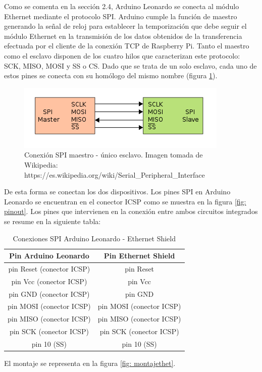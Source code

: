 Como se comenta en la sección 2.4, Arduino Leonardo se conecta al módulo Ethernet mediante el protocolo SPI. Arduino cumple la función de maestro generando la señal de reloj para establecer la temporización que debe seguir el módulo Ethernet en la transmisión de los datos obtenidos de la transferencia efectuada por el cliente de la conexión TCP de Raspberry Pi.
Tanto el maestro como el esclavo disponen de los cuatro hilos que caracterizan este protocolo: SCK, MISO, MOSI y SS o CS. Dado que se trata de un solo esclavo, cada uno de estos pines se conecta con su homólogo del mismo nombre (figura \ref{fig: SPImaestroesclavo}).
    \begin{figure}[H]
    \centering
    \includegraphics[scale = 0.6]{capitulo_04/figuras_dir/SPIconexion.jpg}
    \caption{Conexión SPI maestro - único esclavo. Imagen tomada de Wikipedia: https://es.wikipedia.org/wiki/Serial\_Peripheral\_Interface}
    \label{fig: SPImaestroesclavo}
    \end{figure}
De esta forma se conectan los dos dispositivos. Los pines SPI en Arduino Leonardo se encuentran en el conector ICSP como se muestra en la figura \ref{fig: pinout}.
Los pines que intervienen en la conexión entre ambos circuitos integrados se resume en la siguiente tabla:
\begin{table}[H]
\caption{Conexiones SPI Arduino Leonardo - Ethernet Shield}  
\begin{center}
\begin{tabular}{c|c}
     {\bfseries Pin Arduino Leonardo} & {\bfseries Pin Ethernet Shield} \\ \hline
     pin Reset (conector ICSP) & pin Reset \\
     pin Vcc (conector ICSP) & pin Vcc \\
     pin GND (conector ICSP) & pin GND \\
     pin MOSI (conector ICSP) & pin MOSI (conector ICSP) \\
     pin MISO (conector ICSP) & pin MISO (conector ICSP) \\
     pin SCK (conector ICSP) & pin SCK (conector ICSP) \\
     pin 10 (SS) & pin 10 (SS) \\
\end{tabular}
\end{center}
\end{table}
El montaje se representa en la figura \ref{fig: montajethet}.

